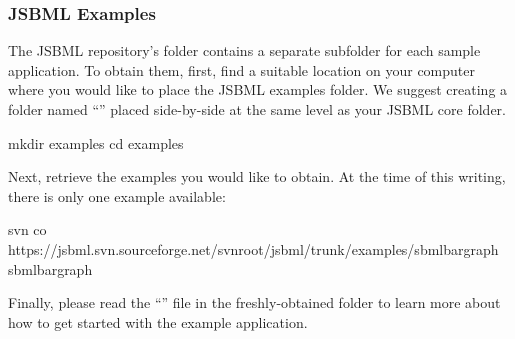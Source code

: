 \subsubsection{JSBML Examples}
\label{sec:jsbml-repo-examples}

The JSBML repository's  folder contains a separate
subfolder for each sample application.  To obtain them, first, find a
suitable location on your computer where you would like to place the JSBML
examples folder.  We suggest creating a folder named ``''
placed side-by-side at the same level as your JSBML core folder.

\begin{example}[style=bash, title={Creating a folder for the examples.}]
mkdir examples
cd examples
\end{example}

Next, retrieve the examples you would like to obtain.  At the time of this
writing, there is only one example available:

\begin{example}[style=bash, title={Retrieving the \emph{SBML Bar Graph}
    example application.}] 
svn co https://jsbml.svn.sourceforge.net/svnroot/jsbml/trunk/examples/sbmlbargraph sbmlbargraph
\end{example}

Finally, please read the ``'' file in the freshly-obtained
 folder to learn more about how to get started with the
example application.







